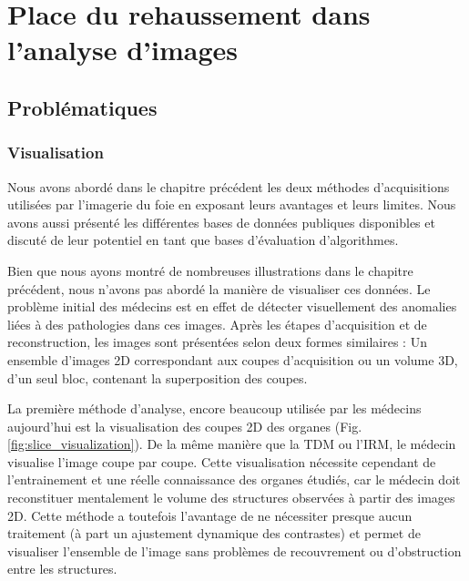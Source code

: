 %
\chapter{Place du rehaussement dans l'analyse d'images}



\section{Problématiques}
    \subsection{Visualisation}

    Nous avons abordé dans le chapitre précédent les deux méthodes d'acquisitions utilisées par l'imagerie du foie en exposant leurs avantages et leurs limites. Nous avons aussi présenté les différentes bases de données publiques disponibles et discuté de leur potentiel en tant que bases d'évaluation d'algorithmes.

    Bien que nous ayons montré de nombreuses illustrations dans le chapitre précédent, nous n'avons pas abordé la manière de visualiser ces données.
    Le problème initial des médecins est en effet de détecter visuellement des anomalies liées à des pathologies dans ces images. Après les étapes d'acquisition et de reconstruction, les images sont présentées selon deux formes similaires : Un ensemble d'images 2D correspondant aux coupes d'acquisition ou un volume 3D, d'un seul bloc, contenant la superposition des coupes.
    
    La première méthode d'analyse, encore beaucoup utilisée par les médecins aujourd'hui est la visualisation des coupes 2D des organes (Fig. \ref{fig:slice_visualization}). De la même manière que la TDM ou l'IRM, le médecin visualise l'image coupe par coupe. Cette visualisation nécessite cependant de l'entrainement et une réelle connaissance des organes étudiés, car le médecin doit reconstituer mentalement le volume des structures observées à partir des images 2D. Cette méthode a toutefois l'avantage de ne nécessiter presque aucun traitement (à part un ajustement dynamique des contrastes) et permet de visualiser l'ensemble de l'image sans problèmes de recouvrement ou d'obstruction entre les structures. 

